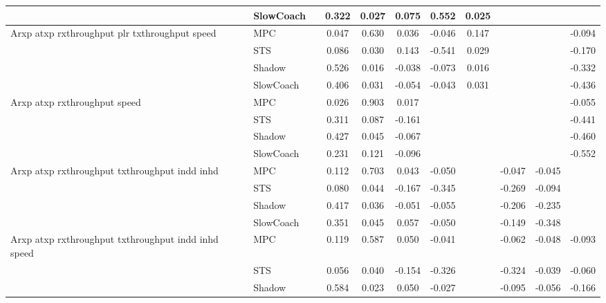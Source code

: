 \begin{tabular}{|l|l|*{9}{c|}}
                              & SlowCoach &       &     0.322 &     0.027 &  0.075 &  0.552 &  0.025 &      &      &       \\
\midrule
Arxp atxp rxthroughput plr txthroughput speed    & MPC &       &     0.047 &     0.630 &  0.036 & -0.046 &  0.147 &      &      &   -0.094 \\
                              & STS &       &     0.086 &     0.030 &  0.143 & -0.541 &  0.029 &      &      &   -0.170 \\
                              & Shadow &       &     0.526 &     0.016 & -0.038 & -0.073 &  0.016 &      &      &   -0.332 \\
                              & SlowCoach &       &     0.406 &     0.031 & -0.054 & -0.043 &  0.031 &      &      &   -0.436 \\
\midrule
Arxp atxp rxthroughput speed    & MPC &       &     0.026 &     0.903 &  0.017 &     &     &      &      &   -0.055 \\
                              & STS &       &     0.311 &     0.087 & -0.161 &     &     &      &      &   -0.441 \\
                              & Shadow &       &     0.427 &     0.045 & -0.067 &     &     &      &      &   -0.460 \\
                              & SlowCoach &       &     0.231 &     0.121 & -0.096 &     &     &      &      &   -0.552 \\
\midrule
Arxp atxp rxthroughput txthroughput indd inhd    & MPC &       &     0.112 &     0.703 &  0.043 & -0.050 &     &  -0.047 &  -0.045 &       \\
                              & STS &       &     0.080 &     0.044 & -0.167 & -0.345 &     &  -0.269 &  -0.094 &       \\
                              & Shadow &       &     0.417 &     0.036 & -0.051 & -0.055 &     &  -0.206 &  -0.235 &       \\
                              & SlowCoach &       &     0.351 &     0.045 &  0.057 & -0.050 &     &  -0.149 &  -0.348 &       \\
\midrule
Arxp atxp rxthroughput txthroughput indd inhd speed    & MPC &       &     0.119 &     0.587 &  0.050 & -0.041 &     &  -0.062 &  -0.048 &   -0.093 \\
                              & STS &       &     0.056 &     0.040 & -0.154 & -0.326 &     &  -0.324 &  -0.039 &   -0.060 \\
                              & Shadow &       &     0.584 &     0.023 &  0.050 & -0.027 &     &  -0.095 &  -0.056 &   -0.166 \\

\end{tabular}
